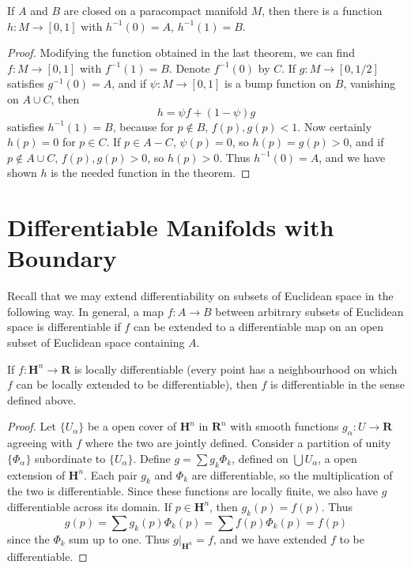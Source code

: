 \begin{corollary}
    If $A$ and $B$ are closed on a paracompact manifold $M$, then there is a function $h: M \to [0,1]$ with $h^{-1}(0) = A$, $h^{-1}(1) = B$.
\end{corollary}
\begin{proof}
    Modifying the function obtained in the last theorem, we can find $f: M \to [0,1]$ with $f^{-1}(1) = B$. Denote $f^{-1}(0)$ by $C$. If $g: M \to [0,1/2]$ satisfies $g^{-1}(0) = A$, and if $\psi: M \to [0,1]$ is a bump function on $B$, vanishing on $A \cup C$, then
    \[ h = \psi f + (1 - \psi) g \]
    satisfies $h^{-1}(1) = B$, because for $p \not \in B$, $f(p), g(p) < 1$. Now certainly $h(p) = 0$ for $p \in C$. If $p \in A - C$, $\psi(p) = 0$, so $h(p) = g(p) > 0$, and if $p \not \in A \cup C$, $f(p), g(p) > 0$, so $h(p) > 0$. Thus $h^{-1}(0) = A$, and we have shown $h$ is the needed function in the theorem.
\end{proof}

\section{Differentiable Manifolds with Boundary}

Recall that we may extend differentiability on subsets of Euclidean space in the following way. In general, a map $f: A \to B$ between arbitrary subsets of Euclidean space is differentiable if $f$ can be extended to a differentiable map on an open subset of Euclidean space containing $A$.

\begin{theorem}
    If $f:\mathbf{H}^n \to \mathbf{R}$ is locally differentiable (every point has a neighbourhood on which $f$ can be locally extended to be differentiable), then $f$ is differentiable in the sense defined above.
\end{theorem}
\begin{proof}
    Let $\{ U_\alpha \}$ be a open cover of $\mathbf{H}^n$ in $\mathbf{R}^n$ with smooth functions $g_\alpha:U \to \mathbf{R}$ agreeing with $f$ where the two are jointly defined. Consider a partition of unity $\{ \Phi_\alpha \}$ subordinate to $\{ U_\alpha \}$. Define $g = \sum g_k \Phi_k$, defined on $\bigcup U_\alpha$, a open extension of $\mathbf{H}^n$. Each pair $g_k$ and $\Phi_k$ are differentiable, so the multiplication of the two is differentiable. Since these functions are locally finite, we also have $g$ differentiable across its domain. If $p \in \mathbf{H}^n$, then $g_k(p) = f(p)$. Thus
    \[ g(p) = \sum g_k(p) \Phi_k(p) = \sum f(p) \Phi_k(p) = f(p) \]
    since the $\Phi_k$ sum up to one. Thus $g|_{\mathbf{H}^n} = f$, and we have extended $f$ to be differentiable.
\end{proof}

